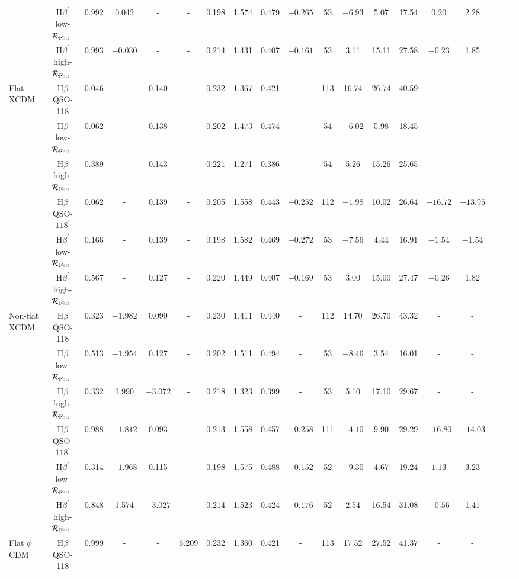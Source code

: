 \documentclass[a4paper,fleqn,usenatbib]{mnras}
\newcommand{\rfe}{${\cal R}_{\rm{Fe\textsc{ii}}}$}
\begin{document}
\begin{table*}
\begin{threeparttable}
\begin{tabular}{l|cccccccccccccccccc}
		& H$\beta^{\prime}$ low-\rfe\ & 0.992 & 0.042& - & - & 0.198 & 1.574 & 0.479 & $-0.265$ & 53 & $-6.93$ & 5.07 & 17.54 & 0.20 & 2.28 \\
		& H$\beta^{\prime}$ high-\rfe\ & 0.993 & $-0.030$ & - & - & 0.214 & 1.431 & 0.407 & $-0.161$ & 53 & 3.11 & 15.11 & 27.58 & $-0.23$ & 1.85 \\
		\hline
		Flat XCDM & H$\beta$ QSO-118 & 0.046 & - & 0.140 & - & 0.232 & 1.367 & 0.421 & - & 113 & 16.74 & 26.74 & 40.59 & - & - \\
		& H$\beta$ low-\rfe\ & 0.062 & - & 0.138 & - & 0.202 & 1.473 & 0.474 & - & 54 & $-6.02$ & 5.98 & 18.45 & - & - \\
		& H$\beta$ high-\rfe\ & 0.389 & - & 0.143 & - & 0.221 & 1.271 & 0.386 & - & 54 & 5.26 & 15.26 & 25.65 & - & - \\
		& H$\beta$ QSO-$118^{\prime}$ & 0.062 & - & 0.139 & - & 0.205 & 1.558 & 0.443 & $-0.252$ & 112 & $-1.98$ & 10.02 & 26.64 & $-16.72$ & $-13.95$ \\
		& H$\beta^{\prime}$ low-\rfe\ & 0.166 & - & 0.139 & - & 0.198 & 1.582 & 0.469 & $-0.272$ & 53 & $-7.56$ & 4.44 & 16.91 & $-1.54$ & $-1.54$ \\
		& H$\beta^{\prime}$ high-\rfe\ & 0.567 & - & 0.127 & - & 0.220 & 1.449 & 0.407 & $-0.169$ & 53 & 3.00 & 15.00 & 27.47 & $-0.26$ & 1.82 \\
		\hline
		Non-flat XCDM & H$\beta$ QSO-118 & 0.323 & $-1.982$ & 0.090 & - & 0.230 & 1.411 & 0.440 & - & 112 & 14.70 & 26.70 & 43.32 & - & - \\
		& H$\beta$ low-\rfe\ & 0.513 & $-1.954$ & 0.127 & - & 0.202 & 1.511 & 0.494 & - & 53 & $-8.46$ & 3.54 & 16.01 & - & -\\
		& H$\beta$ high-\rfe\ & 0.332 & 1.990 & $-3.072$ & - & 0.218 & 1.323 & 0.399 & - & 53 & 5.10 & 17.10 & 29.67 & - & -\\
		& H$\beta$ QSO-$118^{\prime}$ & 0.988 & $-1.812$ & 0.093 & - & 0.213 & 1.558 & 0.457 & $-0.258$ & 111 & $-4.10$ & 9.90 & 29.29 & $-16.80$ & $-14.03$ \\
		& H$\beta^{\prime}$ low-\rfe\ & 0.314 & $-1.968$ & 0.115 & - & 0.198 & 1.575 & 0.488 & $-0.152$ & 52 & $-9.30$ & 4.67 & 19.24 & $1.13$ & $3.23$ \\
		& H$\beta^{\prime}$ high-\rfe\ & 0.848 & 1.574 & $-3.027$ & - & 0.214 & 1.523 & 0.424 & $-0.176$ & 52 & 2.54 & 16.54 & 31.08 & $-0.56$ & 1.41\\
		\hline
		Flat $\phi$CDM & H$\beta$ QSO-118 & 0.999 & - & - & 6.209 & 0.232 & 1.360 & 0.421 & - & 113 & 17.52 & 27.52 & 41.37 & - & - \\

\end{tabular}
\end{threeparttable}
\end{table*}
\end{document}
